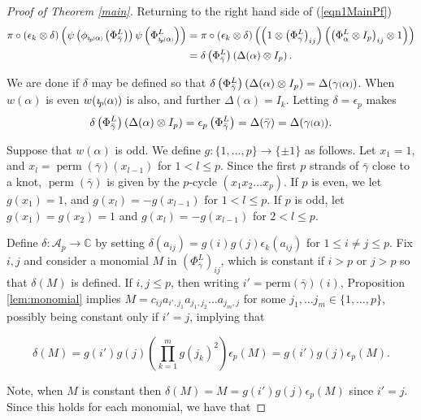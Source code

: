 \documentclass[11pt]{amsart}
\def\C{{\mathbb C}}
\def\A{{\mathcal A}}
\newcommand*{\smallp}[1]{\scalebox{.75}{\ensuremath#1}}
\newcommand*{\subsmallp}[1]{\scalebox{.5}{\ensuremath#1}}
\newcommand{\pp}[2][p]{\imath_{\hspace*{-1pt}#1}\hspace*{-.5pt}\smallp(#2\smallp)}
\newcommand{\subpp}[2][p]{\imath_{\hspace*{-1pt}#1}\hspace*{-.5pt}\subsmallp(#2\subsmallp)}
\newcommand\perm{\operatorname{perm}}
\theoremstyle{definition}
\begin{document}
\begin{proof}[Proof of Theorem \ref{main}]
\noindent Returning to the right hand side of (\ref{eqn1MainPf})
\begin{align*}
\pi\circ(\epsilon_k\otimes\delta)\left(\psi\left(\phi_{\subpp\alpha}\left(\Phi_{\bar\gamma}^L\right)\right)\psi\left(\Phi_{\subpp\alpha}^L\right)\right)
    & = \pi\circ(\epsilon_k\otimes\delta)\left(\left(1\otimes \left(\Phi_{\gamma}^L\right)_{ij}\right)\left(\left(\Phi_\alpha^L\otimes I_p\right)_{ij}\otimes 1\right)\right)\\
    & = \delta\left(\Phi_{\bar\gamma}^L\right)\left(\Delta(\alpha)\otimes I_p\right).
\end{align*}

We are done if $\delta$ may be defined so that $\delta\left(\Phi_{\bar\gamma}^L\right)\left(\Delta(\alpha)\otimes I_p\right) = \Delta(\gamma\smallp(\alpha\smallp))$.  When $w(\alpha)$ is even $w(\pp\alpha)$ is also, and further $\Delta(\alpha)=I_k$. Letting $\delta = \epsilon_p$ makes 
\begin{equation*}
\delta\left(\Phi_{\bar\gamma}^L\right)\left(\Delta(\alpha)\otimes I_p\right) = \epsilon_p\left(\Phi_{\bar\gamma}^L\right) = \Delta(\bar\gamma) = \Delta(\gamma\smallp(\alpha\smallp)).
\end{equation*}

Suppose that $w(\alpha)$ is odd. We define $g\colon \{1,\ldots,p\}\rightarrow \{\pm 1\}$ as follows. Let $x_1 = 1$, and $x_l = \perm(\bar\gamma)(x_{l-1})$ for $1<l\le p$. Since the first $p$ strands of $\bar\gamma$ close to a knot, $\perm(\bar\gamma)$ is given by the $p$-cycle $(x_1x_2\ldots x_p)$. If $p$ is even, we let $g(x_1) = 1$, and $g(x_l) = -g(x_{l-1})$ for $1<l\le p$. If $p$ is odd, let $g(x_1) = g(x_2) = 1$ and $g(x_l) = -g(x_{l-1})$ for $2<l\le p$.

 Define $\delta: \A_p\to \C$ by setting $\delta(a_{ij}) = g(i)g(j)\epsilon_k(a_{ij})$ for $1\le i\ne j\le p$. Fix $i,j$ and consider a monomial $M$ in $\left(\Phi_{\bar\gamma}^L\right)_{ij}$, which is constant if $i>p$ or $j>p$ so that $\delta(M)$ is defined. If $i,j\le p$, then writing $i'=\text{perm}(\bar\gamma)(i)$, Proposition \ref{lem:monomial} implies $M=c_{ij}a_{i',j_1}a_{j_1,j_2}\ldots a_{j_m,j}$ for some $j_1,\ldots j_m\in \{1,\ldots,p\}$, possibly being constant only if $i'=j$, implying that 

$$\delta(M) = g(i')g(j)\left(\prod_{k=1}^m g(j_k)^2\right)\epsilon_p(M) = g(i')g(j)\epsilon_p(M).$$

\noindent Note, when $M$ is constant then $\delta(M) = M = g(i')g(j)\epsilon_p(M)$ since $i'=j$. Since this holds for each monomial, we have that


\end{proof}
\end{document}
